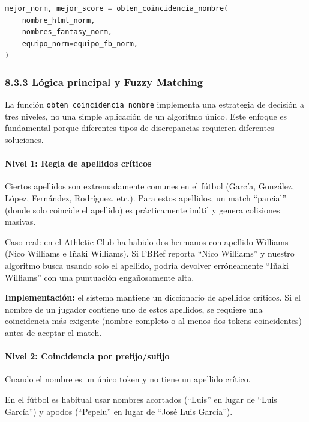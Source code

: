 \begin{lstlisting}[language=Python,caption={Búsqueda contextual de candidatos por partido usando fuzzy matching acotado}]
mejor_norm, mejor_score = obten_coincidencia_nombre(
    nombre_html_norm, 
    nombres_fantasy_norm,
    equipo_norm=equipo_fb_norm,
)
\end{lstlisting}

\subsubsection{8.3.3 Lógica principal y Fuzzy Matching}

La función \texttt{obten\_coincidencia\_nombre} implementa una estrategia de decisión a tres niveles, no una simple aplicación de un algoritmo único. 
Este enfoque es fundamental porque diferentes tipos de discrepancias requieren diferentes soluciones.

\paragraph{Nivel 1: Regla de apellidos críticos}

Ciertos apellidos son extremadamente comunes en el fútbol (García, González, López, Fernández, Rodríguez, etc.). Para estos apellidos, un match 
``parcial'' (donde solo coincide el apellido) es prácticamente inútil y genera colisiones masivas.

Caso real: en el Athletic Club ha habido dos hermanos con apellido Williams (Nico Williams e Iñaki Williams). Si FBRef reporta ``Nico Williams'' 
y nuestro algoritmo busca usando solo el apellido, podría devolver erróneamente ``Iñaki Williams'' con una puntuación engañosamente alta.

\textbf{Implementación:} el sistema mantiene un diccionario de apellidos críticos. Si el nombre de un jugador contiene uno de estos apellidos, 
se requiere una coincidencia más exigente (nombre completo o al menos dos tokens coincidentes) antes de aceptar el match.

\paragraph{Nivel 2: Coincidencia por prefijo/sufijo}

Cuando el nombre es un único token y no tiene un apellido crítico.

En el fútbol es habitual usar nombres acortados (``Luis'' en lugar de ``Luis García'') y apodos (``Pepelu'' en lugar de ``José Luis García'').


